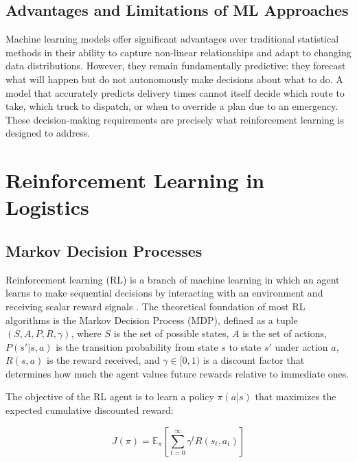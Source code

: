 \subsection{Advantages and Limitations of ML Approaches}

Machine learning models offer significant advantages over traditional statistical
methods in their ability to capture non-linear relationships and adapt to changing
data distributions. However, they remain fundamentally predictive: they forecast
what will happen but do not autonomously make decisions about what to do. A model
that accurately predicts delivery times cannot itself decide which route to take,
which truck to dispatch, or when to override a plan due to an emergency. These
decision-making requirements are precisely what reinforcement learning is designed
to address.

\section{Reinforcement Learning in Logistics}

\subsection{Markov Decision Processes}

Reinforcement learning (RL) is a branch of machine learning in which an agent
learns to make sequential decisions by interacting with an environment and
receiving scalar reward signals \cite{sutton2018}. The theoretical foundation of
most RL algorithms is the Markov Decision Process (MDP), defined as a tuple
$(S, A, P, R, \gamma)$, where $S$ is the set of possible states, $A$ is the set
of actions, $P(s' | s, a)$ is the transition probability from state $s$ to state
$s'$ under action $a$, $R(s, a)$ is the reward received, and $\gamma \in [0, 1)$
is a discount factor that determines how much the agent values future rewards
relative to immediate ones.

The objective of the RL agent is to learn a policy $\pi(a | s)$ that maximizes
the expected cumulative discounted reward:

\begin{equation}
    J(\pi) = \mathbb{E}_{\pi} \left[ \sum_{t=0}^{\infty} \gamma^t R(s_t, a_t) \right]
\end{equation}

